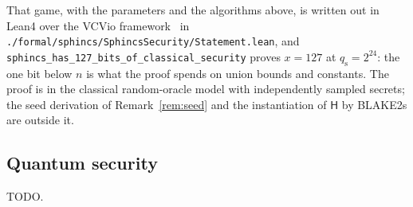 \documentclass[11pt]{article}
\theoremstyle{definition}
\theoremstyle{plain}
\theoremstyle{remark}
\newcommand{\hash}{\mathsf{H}}
\newcommand{\qs}{q_{\mathrm{s}}}
\begin{document}
That game, with the parameters and the algorithms above, is written out in Lean4 over the VCVio framework~\cite{VCVio} in \texttt{./formal/sphincs/SphincsSecurity/Statement.lean}, and \texttt{sphincs\_has\_127\_bits\_of\_classical\_security} proves $x=127$ at $\qs=2^{24}$: the one bit below $n$ is what the proof spends on union bounds and constants. The proof is in the classical random-oracle model with independently sampled secrets; the seed derivation of Remark~\ref{rem:seed} and the instantiation of $\hash$ by BLAKE2s are outside it.

\subsection{Quantum security}
\label{sec:quantum}

TODO.



\end{document}
